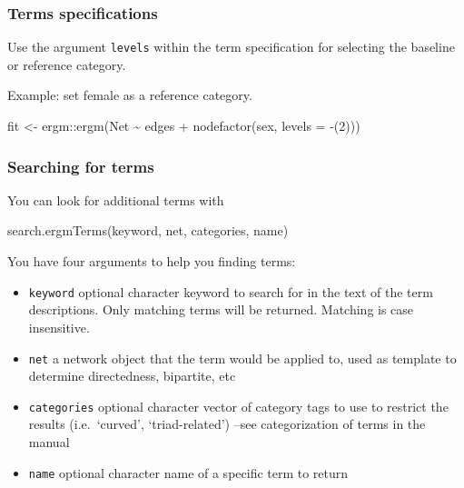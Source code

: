 \documentclass[
]{article}
\newenvironment{Shaded}{\begin{snugshade}}{\end{snugshade}}
\newcommand{\AttributeTok}[1]{\textcolor[rgb]{0.77,0.63,0.00}{#1}}
\newcommand{\DecValTok}[1]{\textcolor[rgb]{0.00,0.00,0.81}{#1}}
\newcommand{\FunctionTok}[1]{\textcolor[rgb]{0.00,0.00,0.00}{#1}}
\newcommand{\NormalTok}[1]{#1}
\newcommand{\OtherTok}[1]{\textcolor[rgb]{0.56,0.35,0.01}{#1}}
\newcommand{\SpecialCharTok}[1]{\textcolor[rgb]{0.00,0.00,0.00}{#1}}
\newcommand{\StringTok}[1]{\textcolor[rgb]{0.31,0.60,0.02}{#1}}
\begin{document}
\hypertarget{terms-specifications}{%
\subsubsection{Terms specifications}\label{terms-specifications}}

Use the argument \texttt{levels} within the term specification for
selecting the baseline or reference category.

Example: set female as a reference category.

\begin{Shaded}
\begin{Highlighting}[]
\NormalTok{fit }\OtherTok{\textless{}{-}}\NormalTok{ ergm}\SpecialCharTok{::}\FunctionTok{ergm}\NormalTok{(Net }\SpecialCharTok{\textasciitilde{}}\NormalTok{ edges }\SpecialCharTok{+} \FunctionTok{nodefactor}\NormalTok{(}\StringTok{\textquotesingle{}sex\textquotesingle{}}\NormalTok{, }\AttributeTok{levels =} \SpecialCharTok{{-}}\NormalTok{(}\DecValTok{2}\NormalTok{)))}
\end{Highlighting}
\end{Shaded}

\hypertarget{searching-for-terms}{%
\subsubsection{Searching for terms}\label{searching-for-terms}}

You can look for additional terms with

\begin{Shaded}
\begin{Highlighting}[]
\FunctionTok{search.ergmTerms}\NormalTok{(keyword, net, categories, name)}
\end{Highlighting}
\end{Shaded}

You have four arguments to help you finding terms:

\begin{itemize}
\item
  \texttt{keyword} optional character keyword to search for in the text
  of the term descriptions. Only matching terms will be returned.
  Matching is case insensitive.
\item
  \texttt{net} a network object that the term would be applied to, used
  as template to determine directedness, bipartite, etc
\item
  \texttt{categories} optional character vector of category tags to use
  to restrict the results (i.e.~`curved', `triad-related') --see
  categorization of terms in the manual
\item
  \texttt{name} optional character name of a specific term to return
\end{itemize}
\end{document}
